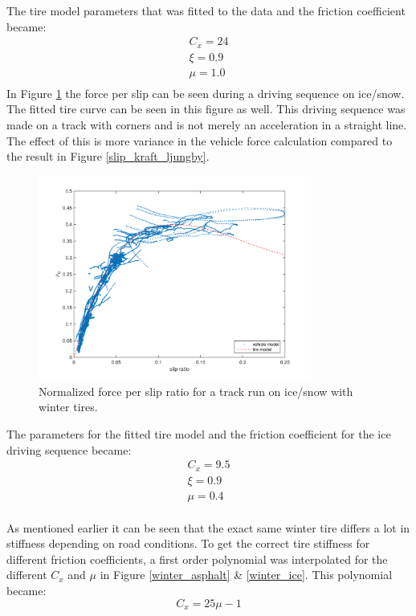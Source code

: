 The tire model parameters that was fitted to the data and the friction coefficient became:
\begin{equation}
\label{winter_asphalt}
\begin{split}
C_{x} = 24 \\
\xi = 0.9 \\
\mu = 1.0 \\
\end{split}
\end{equation}
In Figure \ref{slip_kraft_is} the force per slip can be seen during a driving sequence on ice/snow. The fitted tire curve can be seen in this figure as well. This driving sequence was made on a track with corners and is not merely an acceleration in a straight line. The effect of this is more variance in the vehicle force calculation compared to the result in Figure \ref{slip_kraft_ljungby}. 

\begin{figure}[h]
	\centering
	\includegraphics[width=0.8\textwidth]{Pictures/slip_kraft_is}
	\caption {Normalized force per slip ratio for a track run on ice/snow with winter tires.}
	\label{slip_kraft_is}
\end{figure}

The parameters for the fitted tire model and the friction coefficient for the ice driving sequence became:
\begin{equation}
\label{winter_ice}
\begin{split}
C_{x} = 9.5 \\
\xi = 0.9 \\
\mu = 0.4 \\
\end{split}
\end{equation}

As mentioned earlier it can be seen that the exact same winter tire differs a lot in stiffness depending on road conditions. To get the correct tire stiffness for different friction coefficients, a first order polynomial was interpolated for the different $ C_{x} $ and $ \mu $ in Figure \ref{winter_asphalt} \& \ref{winter_ice}. This polynomial became:
\begin{equation}
	C_{x} = 25\mu - 1
\end{equation}


